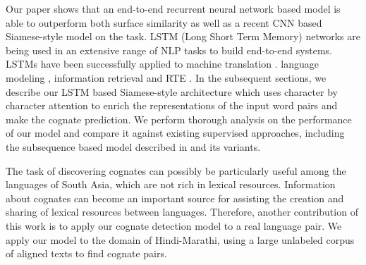 \documentclass[11pt,letterpaper]{article}
\begin{document}
Our paper shows that an end-to-end recurrent neural network based model is able to outperform both surface similarity as well as a recent CNN based Siamese-style model \cite{rama2016siamese} on the task. LSTM (Long Short Term Memory) networks are being used in an extensive range of NLP tasks to build end-to-end systems. LSTMs have been successfully applied to machine translation \cite{bahdanau2014neural}. language modeling \cite{mikolov2010recurrent}, information retrieval \cite{sordoni2015hierarchical} and RTE \cite{snli:emnlp2015}. In the subsequent sections, we describe our LSTM based Siamese-style architecture which uses character by character attention to enrich the representations of the input word pairs and make the cognate prediction. We perform thorough analysis on the performance of our model and compare it against existing supervised approaches, including the subsequence based model described in \cite{rama2015automatic} and its variants.



The task of discovering cognates can possibly be particularly useful among the languages of South Asia, which are not rich in lexical resources. Information about cognates can become an important source for assisting the creation and sharing of lexical resources between languages. Therefore, another contribution of this work is to apply our cognate detection model to a real language pair. We apply our model to the domain of Hindi-Marathi, using a large unlabeled corpus of aligned texts to find cognate pairs.
\end{document}
